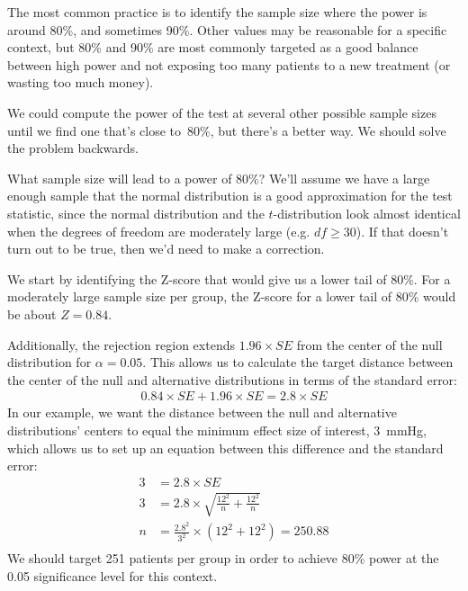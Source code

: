 The most common practice is to identify the sample size where
the power is around 80\%, and sometimes 90\%.
Other values may be reasonable for a specific context,
but 80\% and 90\% are most commonly targeted as a good
balance between high power and not exposing too many
patients to a new treatment (or wasting too much money).

We could compute the power of the test at several other
possible sample sizes until we find one that's close to~80\%,
but there's a better way.
We should solve the problem backwards.

\begin{examplewrap}
\begin{nexample}{What sample size will lead to a power of 80\%?}
  We'll assume we have a large enough sample that the normal
  distribution is a good approximation for the test statistic,
  since the normal distribution and the $t$-distribution
  look almost identical when the degrees of freedom are
  moderately large (e.g. $df \geq 30$).
  If that doesn't turn out to be true, then we'd need to make
  a correction.

  We start by identifying the Z-score that would give us a lower
  tail of 80\%.
  For a moderately large sample size per group,
  the Z-score for a lower tail of 80\% would be about $Z = 0.84$.
  \begin{center}
  \end{center}
  Additionally, the rejection region extends
  $1.96\times SE$ from the center of the null distribution
  for $\alpha = 0.05$.
  This allows us to calculate the target distance between
  the center of the null and alternative distributions in
  terms of the standard error:
  \begin{align*}
  0.84 \times SE + 1.96 \times SE = 2.8 \times SE
  \end{align*}
  In our example, we want the distance between the null
  and alternative distributions' centers to equal the minimum
  effect size of interest, 3~mmHg, which allows us to set up
  an equation between this difference and the standard error:
  \begin{align*}
  3 &= 2.8 \times SE \\
  3 &= 2.8 \times \sqrt{\frac{12^2}{n} + \frac{12^2}{n}} \\
  n &= \frac{2.8^2}{3^2} \times \left( 12^2 + 12^2 \right)
    = 250.88 \\
  \end{align*}
  We should target 251 patients per group in order to achieve
  80\% power at the 0.05 significance level for this context.
\end{nexample}
\end{examplewrap}

